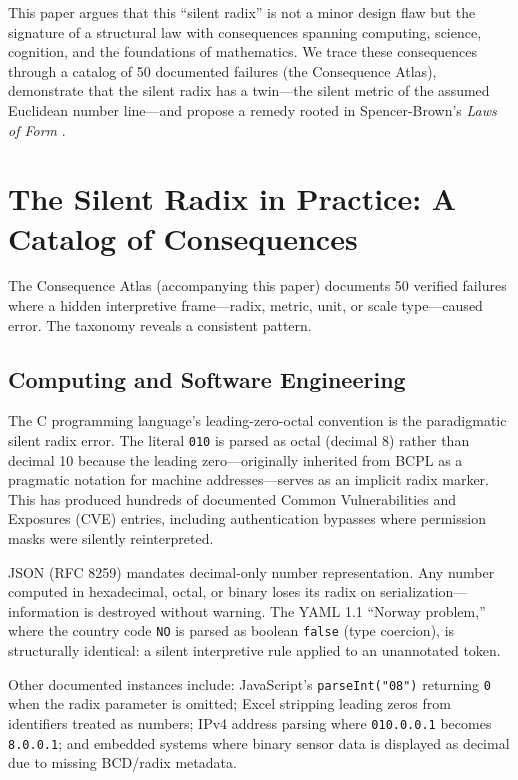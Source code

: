 \documentclass[12pt,a4paper]{article}
\theoremstyle{definition}
\theoremstyle{remark}
\begin{document}
This paper argues that this ``silent radix'' is not a minor design flaw but the signature of a structural law with consequences spanning computing, science, cognition, and the foundations of mathematics. We trace these consequences through a catalog of 50 documented failures (the Consequence Atlas), demonstrate that the silent radix has a twin---the silent metric of the assumed Euclidean number line---and propose a remedy rooted in Spencer-Brown's \emph{Laws of Form} \cite{spencerbrown1969}.

\section{The Silent Radix in Practice: A Catalog of Consequences}

The Consequence Atlas (accompanying this paper) documents 50 verified failures where a hidden interpretive frame---radix, metric, unit, or scale type---caused error. The taxonomy reveals a consistent pattern.

\subsection{Computing and Software Engineering}

The C programming language's leading-zero-octal convention \cite{ritchie1993} is the paradigmatic silent radix error. The literal \texttt{010} is parsed as octal (decimal 8) rather than decimal 10 because the leading zero---originally inherited from BCPL as a pragmatic notation for machine addresses---serves as an implicit radix marker. This has produced hundreds of documented Common Vulnerabilities and Exposures (CVE) entries, including authentication bypasses where permission masks were silently reinterpreted.

JSON (RFC 8259) mandates decimal-only number representation. Any number computed in hexadecimal, octal, or binary loses its radix on serialization---information is destroyed without warning. The YAML 1.1 ``Norway problem,'' where the country code \texttt{NO} is parsed as boolean \texttt{false} (type coercion), is structurally identical: a silent interpretive rule applied to an unannotated token.

Other documented instances include: JavaScript's \texttt{parseInt("08")} returning \texttt{0} when the radix parameter is omitted; Excel stripping leading zeros from identifiers treated as numbers; IPv4 address parsing where \texttt{010.0.0.1} becomes \texttt{8.0.0.1}; and embedded systems where binary sensor data is displayed as decimal due to missing BCD/radix metadata.
\end{document}
